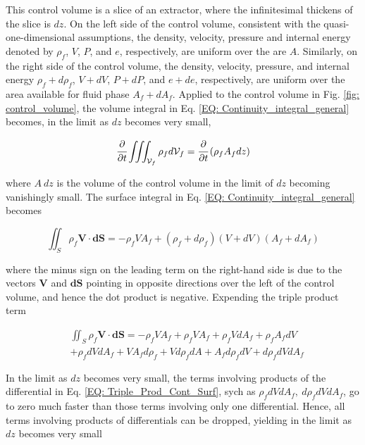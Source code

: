 \documentclass[../Article_Model_Parameters.tex]{subfiles}
\begin{document}
	This control volume is a slice of an extractor, where the infinitesimal thickens of the slice is $dz$. On the left side of the control volume, consistent with the quasi-one-dimensional assumptions, the density, velocity, pressure and internal energy denoted by $\rho_f$, $V$, $P$, and $e$, respectively, are uniform over the are $A$. Similarly, on the right side of the control volume, the density, velocity, pressure, and internal energy $\rho_f+d\rho_f$, $V+dV$, $P+dP$, and $e+de$, respectively, are uniform over the area available for fluid phase $A_f+dA_f$. Applied to the control volume in Fig. \ref{fig: control_volume}, the volume integral in Eq. \ref{EQ: Continuity_integral_general} becomes, in the limit as $dz$ becomes very small,
	
	{\footnotesize
		\begin{equation}
			\cfrac{\partial}{\partial t} \iiint_{\mathcal{V}_f} \rho_f d\mathcal{V}_f = \cfrac{\partial}{\partial t}\left( \rho_f A_f dz \right)
			\label{EQ: Cont_Simpl_Vol}
		\end{equation}
	}

	where $A~dz$ is the volume of the control volume in the limit of $dz$ becoming vanishingly small. The surface integral in Eq. \ref{EQ: Continuity_integral_general} becomes
	
	{\footnotesize
		\begin{equation}
			\iint_S \rho_f \textbf{V} \cdot \textbf{dS} = -\rho_f V A_f + (\rho_f+d\rho_f)(V+dV)(A_f+dA_f)
		\end{equation}
	}

	where the minus sign on the leading term on the right-hand side is due to the vectors $\textbf{V}$ and $\textbf{dS}$ pointing in opposite directions over the left of the control volume, and hence the dot product is negative. Expending the triple product term 
	 
	{\footnotesize
		\begin{align}
			&\iint_S \rho_f \textbf{V} \cdot \textbf{dS} = -\rho_f V A_f + \rho_f V A_f + \rho_f V dA_f + \rho_f A_f dV \nonumber \\ 
			&+ \rho_f dV dA_f + V A_f d\rho_f + V d\rho_f dA + A_f d\rho_f dV + d\rho_f dV dA_f
			\label{EQ: Triple_Prod_Cont_Surf}
		\end{align}
	}
	
	In the limit as $dz$ becomes very small, the terms involving products of the differential in Eq. \ref{EQ: Triple_Prod_Cont_Surf}, sych as $\rho_f dV dA_f,~d\rho_f dV dA_f$, go to zero much faster than those terms involving only one differential. Hence, all terms involving products of differentials can be dropped, yielding in the limit as $dz$ becomes very small
	
\end{document}
